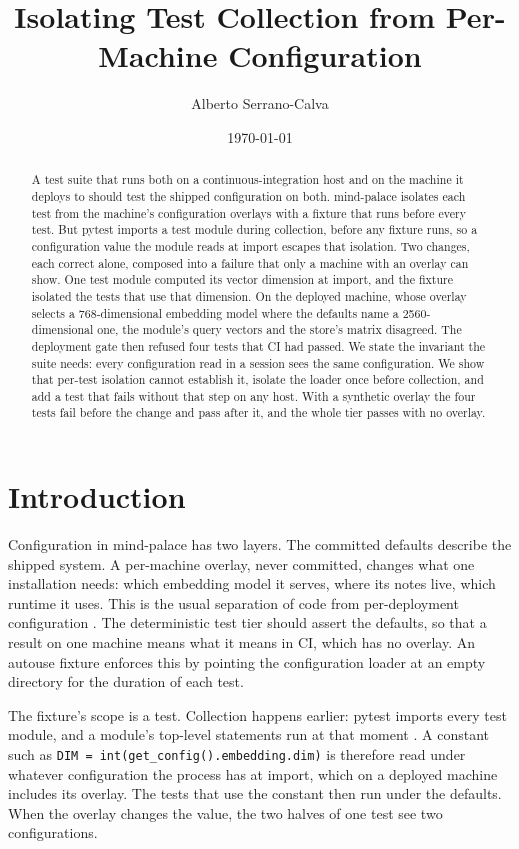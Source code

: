 \documentclass[11pt]{article}
\title{Isolating Test Collection from Per-Machine Configuration}
\author{Alberto Serrano-Calva}
\date{\today}
\theoremstyle{plain}
\theoremstyle{definition}
\theoremstyle{remark}
\newcommand{\code}[1]{\texttt{#1}}
\begin{document}
\maketitle

\begin{abstract}
A test suite that runs both on a continuous-integration host and on the machine it deploys to
should test the shipped configuration on both. mind-palace isolates each test from the machine's
configuration overlays with a fixture that runs before every test. But pytest imports a test
module during collection, before any fixture runs, so a configuration value the module reads at
import escapes that isolation. Two changes, each correct alone, composed into a failure that only
a machine with an overlay can show. One test module computed its vector dimension at import, and
the fixture isolated the tests that use that dimension. On the deployed machine, whose overlay
selects a 768-dimensional embedding model where the defaults name a 2560-dimensional one, the
module's query vectors and the store's matrix disagreed. The deployment gate then refused four
tests that CI had passed. We state the invariant the suite needs: every configuration read in a
session sees the same configuration. We show that per-test isolation cannot establish it,
isolate the loader once before collection, and add a test that fails without that step on any
host. With a synthetic overlay the four tests fail before the change and pass after it, and the
whole tier passes with no overlay.
\end{abstract}

\section{Introduction}
Configuration in mind-palace has two layers. The committed defaults describe the shipped system.
A per-machine overlay, never committed, changes what one installation needs: which embedding
model it serves, where its notes live, which runtime it uses. This is the usual separation of
code from per-deployment configuration \cite{twelvefactor}. The deterministic test tier should
assert the defaults, so that a result on one machine means what it means in CI, which has no
overlay. An autouse fixture enforces this by pointing the configuration loader at an empty
directory for the duration of each test.

The fixture's scope is a test. Collection happens earlier: pytest imports every test module, and
a module's top-level statements run at that moment \cite{pytestdocs}. A constant such as
\code{DIM = int(get\_config().embedding.dim)} is therefore read under whatever configuration the
process has at import, which on a deployed machine includes its overlay. The tests that use the
constant then run under the defaults. When the overlay changes the value, the two halves of one
test see two configurations.
\end{document}
